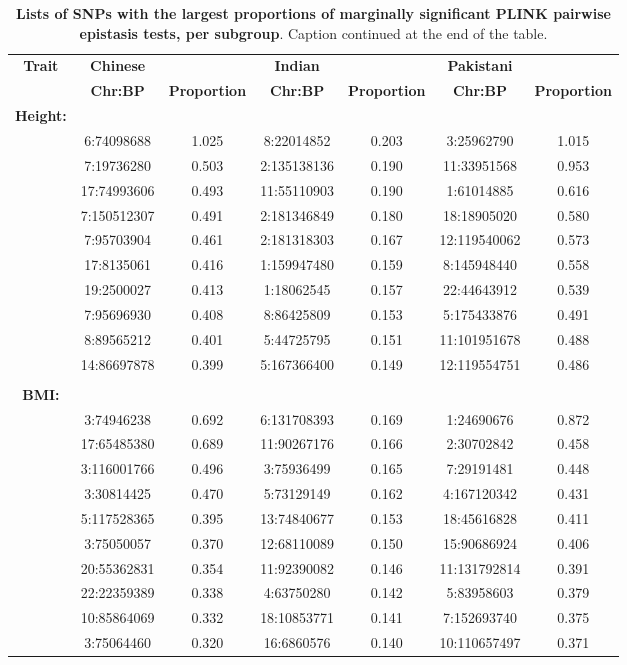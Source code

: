 \documentclass[12pt,a4paper]{article}
\begin{document}
\begin{landscape}
\setlength{\footskip}{2cm}
\begin{table}[ht]
\centering
\begin{tabular}{ccccccc}
  \hline
  \textbf{Trait} & \textbf{Chinese} & & \textbf{Indian} & & \textbf{Pakistani} & \\ 
& \textbf{Chr:BP} & \textbf{Proportion} & \textbf{Chr:BP} & \textbf{Proportion} & \textbf{Chr:BP} & \textbf{Proportion} \\ 
  \hline
\textbf{Height:} & & & & & & \\
& 6:74098688 & 1.025 & 8:22014852 & 0.203 & 3:25962790 & 1.015 \\
  & 7:19736280 & 0.503 & 2:135138136 & 0.190 & 11:33951568 & 0.953 \\ 
  & 17:74993606 & 0.493 & 11:55110903 & 0.190 & 1:61014885 & 0.616 \\ 
  & 7:150512307 & 0.491 & 2:181346849 & 0.180 & 18:18905020 & 0.580 \\ 
  & 7:95703904 & 0.461 & 2:181318303 & 0.167 & 12:119540062 & 0.573 \\ 
  & 17:8135061 & 0.416 & 1:159947480 & 0.159 & 8:145948440 & 0.558 \\ 
  & 19:2500027 & 0.413 & 1:18062545 & 0.157 & 22:44643912 & 0.539 \\ 
  & 7:95696930 & 0.408 & 8:86425809 & 0.153 & 5:175433876 & 0.491 \\ 
  & 8:89565212 & 0.401 & 5:44725795 & 0.151 & 11:101951678 & 0.488 \\ 
  & 14:86697878 & 0.399 & 5:167366400 & 0.149 & 12:119554751 & 0.486 \\
  \\
\textbf{BMI:} & & & & & & \\
& 3:74946238 & 0.692 & 6:131708393 & 0.169 & 1:24690676 & 0.872 \\ 
  & 17:65485380 & 0.689 & 11:90267176 & 0.166 & 2:30702842 & 0.458 \\ 
  & 3:116001766 & 0.496 & 3:75936499 & 0.165 & 7:29191481 & 0.448 \\ 
  & 3:30814425 & 0.470 & 5:73129149 & 0.162 & 4:167120342 & 0.431 \\ 
  & 5:117528365 & 0.395 & 13:74840677 & 0.153 & 18:45616828 & 0.411 \\ 
  & 3:75050057 & 0.370 & 12:68110089 & 0.150 & 15:90686924 & 0.406 \\ 
  & 20:55362831 & 0.354 & 11:92390082 & 0.146 & 11:131792814 & 0.391 \\ 
  & 22:22359389 & 0.338 & 4:63750280 & 0.142 & 5:83958603 & 0.379 \\ 
  & 10:85864069 & 0.332 & 18:10853771 & 0.141 & 7:152693740 & 0.375 \\ 
  & 3:75064460 & 0.320 & 16:6860576 & 0.140 & 10:110657497 & 0.371 \\ 
   \hline
\end{tabular}
\caption[TBD]{\textbf{Lists of SNPs with the largest proportions of marginally significant PLINK pairwise epistasis tests, per subgroup}. Caption continued at the end of the table.}
\label{InterPath-Supp-Table-PLINK-Proportions-TopSNPs-b}
\end{table}
\end{landscape}
\end{document}
